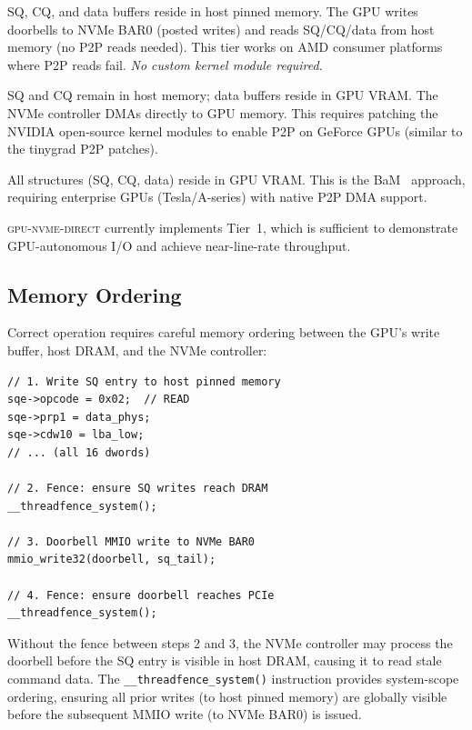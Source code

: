 \documentclass{article}
\newcommand{\sysname}{\textsc{gpu-nvme-direct}}
\begin{document}
\begin{description}[leftmargin=*,topsep=4pt,itemsep=2pt]
\item[Tier 1 (Write-Only P2P):] SQ, CQ, and data buffers reside in host
  pinned memory. The GPU writes doorbells to NVMe BAR0 (posted writes) and
  reads SQ/CQ/data from host memory (no P2P reads needed). This tier works on
  AMD consumer platforms where P2P reads fail. \emph{No custom kernel module
  required.}

\item[Tier 2 (Patched P2P):] SQ and CQ remain in host memory; data buffers
  reside in GPU VRAM. The NVMe controller DMAs directly to GPU memory. This
  requires patching the NVIDIA open-source kernel modules to enable P2P on
  GeForce GPUs (similar to the tinygrad P2P patches).

\item[Tier 3 (Native P2P):] All structures (SQ, CQ, data) reside in GPU VRAM.
  This is the BaM~\cite{qureshi2023bam} approach, requiring enterprise GPUs
  (Tesla/A-series) with native P2P DMA support.
\end{description}

\sysname{} currently implements Tier~1, which is sufficient to demonstrate
GPU-autonomous I/O and achieve near-line-rate throughput.

\subsection{Memory Ordering}

Correct operation requires careful memory ordering between the GPU's write
buffer, host DRAM, and the NVMe controller:

\begin{lstlisting}[caption={Critical memory ordering sequence},label={lst:ordering}]
// 1. Write SQ entry to host pinned memory
sqe->opcode = 0x02;  // READ
sqe->prp1 = data_phys;
sqe->cdw10 = lba_low;
// ... (all 16 dwords)

// 2. Fence: ensure SQ writes reach DRAM
__threadfence_system();

// 3. Doorbell MMIO write to NVMe BAR0
mmio_write32(doorbell, sq_tail);

// 4. Fence: ensure doorbell reaches PCIe
__threadfence_system();
\end{lstlisting}

Without the fence between steps 2 and 3, the NVMe controller may process the
doorbell before the SQ entry is visible in host DRAM, causing it to read stale
command data. The \texttt{\_\_threadfence\_system()} instruction provides
system-scope ordering, ensuring all prior writes (to host pinned memory) are
globally visible before the subsequent MMIO write (to NVMe BAR0) is issued.
\end{document}
